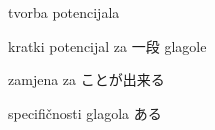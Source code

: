 
\author{Tomislav Mamić}

	
	
	\begin{hyou}
		\item tvorba potencijala
		\item kratki potencijal za 一段 glagole
		\item zamjena za ことが出来る
		\item specifičnosti glagola ある
	\end{hyou}

